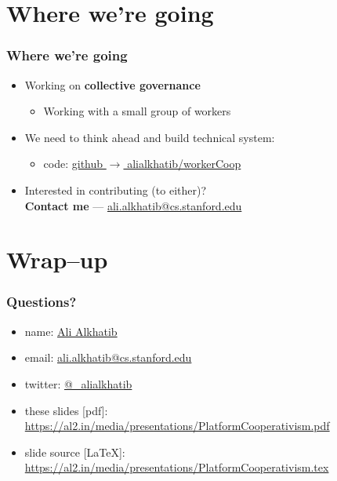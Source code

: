 \documentclass{beamer}
\begin{document}
\section[Moving forward]{Where we're going}
\begin{frame}
  \frametitle{Where we're going}
  \begin{itemize}
    \item Working on \textbf{collective governance}
    \begin{itemize}
      \item Working with a small group of workers
    \end{itemize}
    \item We need to think ahead and build technical system:
    \begin{itemize}
      \item code:
      \href{https://github.com/alialkhatib/workerCoop}{github $\rightarrow$ alialkhatib/workerCoop}
    \end{itemize}
    \item Interested in contributing (to either)?\\
    \textbf{Contact me} --- \href{mailto:ali.alkhatib@cs.stanford.edu}{ali.alkhatib@cs.stanford.edu}
  \end{itemize}
\end{frame}

\section[Questions, etc\ldots]{Wrap--up}
\begin{frame}
  \frametitle{Questions?}
  \begin{itemize}
    \item name: \href{https://ali-alkhatib.com}{Ali Alkhatib}
    \item email: \href{mailto:ali.alkhatib@cs.stanford.edu}{ali.alkhatib@cs.stanford.edu}
    \item twitter: \href{https://twitter.com/_alialkhatib}{@\_alialkhatib}
    \item these slides [pdf]:
    {\footnotesize \url{https://al2.in/media/presentations/PlatformCooperativism.pdf}}
    \item slide source [\LaTeX]:
    {\footnotesize \url{https://al2.in/media/presentations/PlatformCooperativism.tex}}
  \end{itemize}
\end{frame}
\end{document}

